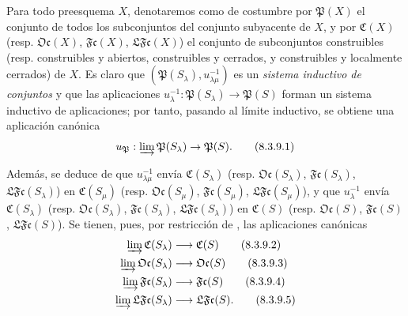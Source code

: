 \begin{env}[8.3.9]
\label{IV.8.3.9-fr}
Para todo preesquema $X$, denotaremos como de costumbre por $\mathfrak P(X)$ el conjunto de todos los subconjuntos del conjunto subyacente de $X$, y por $\mathfrak C(X)$ (resp. $\mathfrak{Oc}(X)$, $\mathfrak{Fc}(X)$, $\mathfrak{LFc}(X)$) el conjunto de subconjuntos construibles (resp. construibles y abiertos, construibles y cerrados, y construibles y localmente cerrados) de $X$.
Es claro que $(\mathfrak P(S_\lambda),u_{\lambda\mu}^{-1})$ es un \emph{sistema inductivo de conjuntos} y que las aplicaciones $u_\lambda^{-1}:\mathfrak P(S_\lambda)\to\mathfrak P(S)$ forman un sistema inductivo de aplicaciones; por tanto, pasando al límite inductivo, se obtiene una aplicación canónica
\begin{equation}
u_{\mathfrak P}:\varinjlim\mathfrak P(S_\lambda)\to\mathfrak P(S).
\tag{8.3.9.1}\label{IV.8.3.9.1-fr}
\end{equation}

Además, se deduce de  que $u_{\lambda\mu}^{-1}$ envía $\mathfrak C(S_\lambda)$ (resp. $\mathfrak{Oc}(S_\lambda)$, $\mathfrak{Fc}(S_\lambda)$, $\mathfrak{LFc}(S_\lambda)$) en $\mathfrak C(S_\mu)$ (resp. $\mathfrak{Oc}(S_\mu)$, $\mathfrak{Fc}(S_\mu)$, $\mathfrak{LFc}(S_\mu)$), y que $u_\lambda^{-1}$ envía $\mathfrak C(S_\lambda)$ (resp. $\mathfrak{Oc}(S_\lambda)$, $\mathfrak{Fc}(S_\lambda)$, $\mathfrak{LFc}(S_\lambda)$) en $\mathfrak C(S)$ (resp. $\mathfrak{Oc}(S)$, $\mathfrak{Fc}(S)$, $\mathfrak{LFc}(S)$).
Se tienen, pues, por restricción de , las aplicaciones canónicas
\begin{align}
\varinjlim\mathfrak C(S_\lambda)&\longrightarrow\mathfrak C(S)
\tag{8.3.9.2}\label{IV.8.3.9.2-fr}\\
\varinjlim\mathfrak{Oc}(S_\lambda)&\longrightarrow\mathfrak{Oc}(S)
\tag{8.3.9.3}\label{IV.8.3.9.3-fr}\\
\varinjlim\mathfrak{Fc}(S_\lambda)&\longrightarrow\mathfrak{Fc}(S)
\tag{8.3.9.4}\label{IV.8.3.9.4-fr}\\
\varinjlim\mathfrak{LFc}(S_\lambda)&\longrightarrow\mathfrak{LFc}(S).
\tag{8.3.9.5}\label{IV.8.3.9.5-fr}
\end{align}
\end{env}

